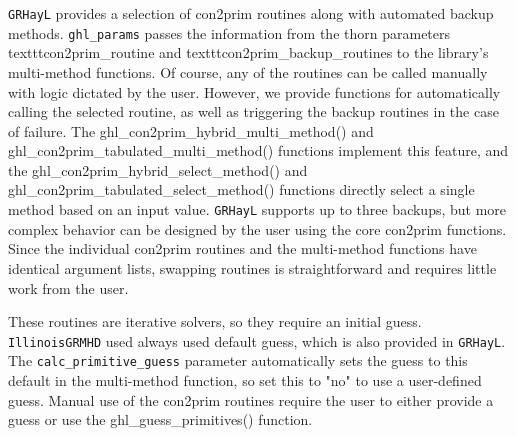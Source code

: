 \documentclass{article}
\newcommand{\grhayl}{\texttt{GRHayL}\xspace}
\newcommand{\igm}{\texttt{IllinoisGRMHD}\xspace}
\begin{document}
\grhayl provides a selection of con2prim routines along with automated
backup methods. \texttt{ghl\_params} passes the information from the
thorn parameters texttt{con2prim\_routine} and texttt{con2prim\_backup\_routines}
to the library's multi-method functions. Of course, any of the routines
can be called manually with logic dictated by the user. However, we
provide functions for automatically calling the selected routine,
as well as triggering the backup routines in the case of failure.
The ghl\_con2prim\_hybrid\_multi\_method() and
ghl\_con2prim\_tabulated\_multi\_method() functions implement this
feature, and the ghl\_con2prim\_hybrid\_select\_method() and
ghl\_con2prim\_tabulated\_select\_method() functions directly select
a single method based on an input value. \grhayl supports up to three
backups, but more complex behavior can be designed by the user using
the core con2prim functions. Since the individual con2prim routines
and the multi-method functions have identical argument lists, swapping
routines is straightforward and requires little work from the user.

These routines are iterative solvers, so they require an initial guess.
\igm used always used default guess, which is also provided in \grhayl.
The \texttt{calc\_primitive\_guess} parameter automatically sets the
guess to this default in the multi-method function, so set this to
"no" to use a user-defined guess. Manual use of the con2prim
routines require the user to either provide a guess or use the
ghl\_guess\_primitives() function.

\end{document}
